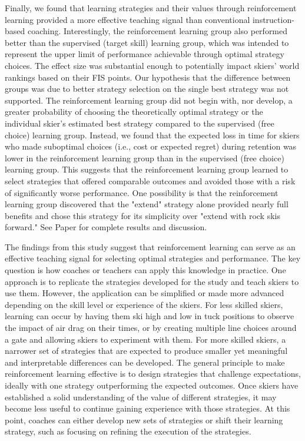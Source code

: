 Finally, we found that learning strategies and their values through reinforcement learning provided a more effective teaching signal than conventional instruction-based coaching. Interestingly, the reinforcement learning group also performed better than the supervised (target skill) learning group, which was intended to represent the upper limit of performance achievable through optimal strategy choices. The effect size was substantial enough to potentially impact skiers' world rankings based on their FIS points. Our hypothesis that the difference between groups was due to better strategy selection on the single best strategy was not supported. The reinforcement learning group did not begin with, nor develop, a greater probability of choosing the theoretically optimal strategy or the individual skier's estimated best strategy compared to the supervised (free choice) learning group. Instead, we found that the expected loss in time for skiers who made suboptimal choices (i.e., cost or expected regret) during retention was lower in the reinforcement learning group than in the supervised (free choice) learning group. This suggests that the reinforcement learning group learned to select strategies that offered comparable outcomes and avoided those with a risk of significantly worse performance. One possibility is that the reinforcement learning group discovered that the "extend" strategy alone provided nearly full benefits and chose this strategy for its simplicity over "extend with rock skis forward." See Paper  for complete results and discussion. 

The findings from this study suggest that reinforcement learning can serve as an effective teaching signal for selecting optimal strategies and performance. The key question is how coaches or teachers can apply this knowledge in practice. One approach is to replicate the strategies developed for the study and teach skiers to use them. However, the application can be simplified or made more advanced depending on the skill level or experience of the skiers. For less skilled skiers, learning can occur by having them ski high and low in tuck positions to observe the impact of air drag on their times, or by creating multiple line choices around a gate and allowing skiers to experiment with them. For more skilled skiers, a narrower set of strategies that are expected to produce smaller yet meaningful and interpretable differences can be developed. The general principle to make reinforcement learning effective is to design strategies that challenge expectations, ideally with one strategy outperforming the expected outcomes. Once skiers have established a solid understanding of the value of different strategies, it may become less useful to continue gaining experience with those strategies. At this point, coaches can either develop new sets of strategies or shift their learning strategy, such as focusing on refining the execution of the strategies. 

